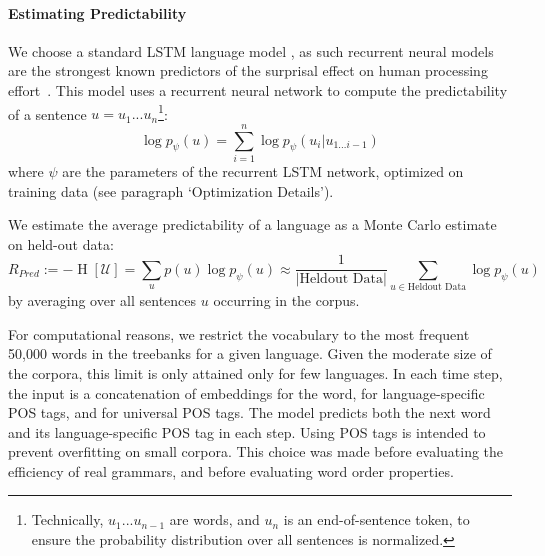 \documentclass[10pt,twoside,lineno]{article}
\newcommand{\utterance}{\mathcal{U}}
\begin{document}
\paragraph{Estimating Predictability}
We choose a standard LSTM language model \citep{goldberg2017neural, hochreiter1997long}, as such recurrent neural models are the strongest known predictors of the surprisal effect on human processing effort~\cite{frank2011insensitivity,goodkind2018predictive}.
This model uses a recurrent neural network to compute the predictability of a sentence $u = u_1...u_n$\footnote{Technically, $u_1...u_{n-1}$ are words, and $u_n$ is an end-of-sentence token, to ensure the probability distribution over all sentences is normalized.}:
\begin{equation}
\log p_\psi(u) = \sum_{i=1}^n \log p_\psi(u_i|u_{1\dots i-1})
\end{equation}
where $\psi$ are the parameters of the recurrent LSTM network, optimized on training data (see paragraph `Optimization Details').


We estimate the average predictability of a language as a Monte Carlo estimate on held-out data:
\begin{equation}
	R_{Pred} := - \operatorname{H}[\utterance] = \sum_{u} p(u) \log p_\psi(u) \approx \frac{1}{|\text{Heldout Data}|} \sum_{u \in \text{Heldout Data}} \log p_\psi(u)
\end{equation}
by averaging over all sentences $u$ occurring in the corpus.


For computational reasons, we restrict the vocabulary to the most frequent 50,000 words in the treebanks for a given language.
Given the moderate size of the corpora, this limit is only attained only for few languages.
In each time step, the input is a concatenation of embeddings for the word, for language-specific POS tags, and for universal POS tags.
The model predicts both the next word and its language-specific POS tag in each step.
Using POS tags is intended to prevent overfitting on small corpora.
This choice was made before evaluating the efficiency of real grammars, and before evaluating word order properties.
\end{document}
